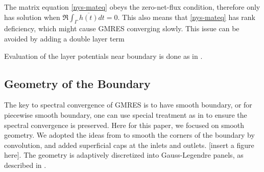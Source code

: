 \documentclass[10pt,twocolumn,letterpaper]{article}
\begin{document}
The matrix equation \eqref{nys-mateq} obeys the zero-net-flux condition,
therefore only has solution when $\Re \int_\Gamma \overline{h(t)} dt = 0$. This
also means that \eqref{nys-mateq} has rank deficiency, which might cause GMRES
converging slowly. This issue can be avoided by adding a double layer term

Evaluation of the layer potentials near boundary is done as in
\cite{wuSolutionStokesFlow2020}.

\subsection{Geometry of the Boundary}

The key to spectral convergence of GMRES is to have smooth boundary, or for
piecewise smooth boundary, one can use special treatment as in
\cite{wuSolutionStokesFlow2020} to ensure the spectral convergence is
preserved. Here for this paper, we focused on smooth geometry. We adopted the
ideas from
\cite{epsteinSmoothedCornersScattered2016,baggeHighlyAccurateSpecial2021} to
smooth the corners of the boundary by convolution, and added superficial caps
at the inlets and outlets. [insert a figure here]. The geometry is adaptively
discretized into Gauss-Legendre panels, as described in
\cite{wuSolutionStokesFlow2020}.
\end{document}
